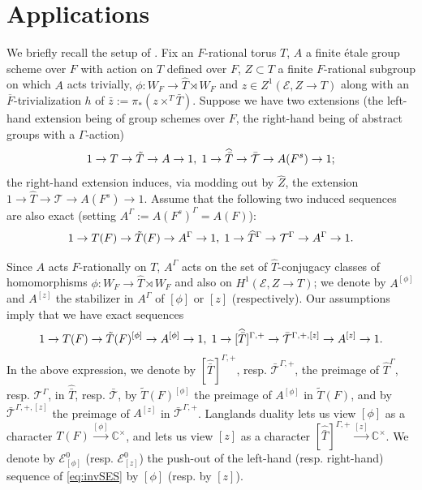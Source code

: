 \documentclass{amsart}
\theoremstyle{definition}
\theoremstyle{remark}
\newcommand{\ov}{\overline}
\begin{document}
\section{Applications}
We briefly recall the setup of \cite[\S 8.3]{Kal26b}. Fix an $F$-rational torus $T$, $A$ a finite \'{e}tale group scheme over $F$ with action on $T$ defined over $F$, $Z \subset T$ a finite $F$-rational subgroup on which $A$ acts trivially, $\phi \colon W_{F} \to \widehat{T} \rtimes W_{F}$ and $z \in Z^{1}(\mathcal{E}, Z \to T)$ along with an $\ov{F}$-trivialization $h$ of $\bar{z}:=\pi_{*}(z \times^{T} \bar{T})$. Suppose we have two extensions (the left-hand extension being of group schemes over $F$, the right-hand being of abstract groups with a $\Gamma$-action)
\begin{equation*}
    1 \to T \to \tilde{T} \to A \to 1, \hspace{1mm} 1 \to \widehat{\bar{T}} \to \bar{\mathcal{T}} \to A(F^{s}) \to 1;
\end{equation*}
the right-hand extension induces, via modding out by $\widehat{Z}$, the extension $1 \to \widehat{T} \to \mathcal{T} \to A(F^{s}) \to 1$. Assume that the following two induced sequences are also exact (setting $A^{\Gamma}:= A(F^{s})^{\Gamma} = A(F)$):
\begin{equation*}
    1 \to T(F) \to \tilde{T}(F) \to A^{\Gamma} \to 1, \hspace{1mm} 1 \to \widehat{T}^{\Gamma} \to \mathcal{T}^{\Gamma} \to A^{\Gamma} \to 1.
\end{equation*}

Since $A$ acts $F$-rationally on $T$, $A^{\Gamma}$ acts on the set of $\widehat{T}$-conjugacy classes of homomorphisms $\phi \colon W_{F} \to \widehat{T} \rtimes W_{F}$ and also on $H^{1}(\mathcal{E}, Z \to T)$; we denote by $A^{[\phi]}$ and $A^{[z]}$ the stabilizer in $A^{\Gamma}$ of $[\phi]$ or $[z]$ (respectively). Our assumptions imply that we have exact sequences 
\begin{equation}\label{eq:invSES}
1 \to T(F) \to \tilde{T}(F)^{[\phi]} \to A^{[\phi]} \to 1, \hspace{1mm} 1 \to [\widehat{\bar{T}}]^{\Gamma,+} \to \bar{\mathcal{T}}^{\Gamma,+,[z]} \to A^{[z]} \to 1.
\end{equation}
In the above expression, we denote by $[\widehat{\bar{T}}]^{\Gamma,+}$, resp. $\bar{\mathcal{T}}^{\Gamma,+}$, the preimage of $\widehat{T}^{\Gamma}$, resp. $\mathcal{T}^{\Gamma}$, in $\widehat{\bar{T}}$, resp. $\bar{\mathcal{T}}$, by $\tilde{T}(F)^{[\phi]}$ the preimage of $A^{[\phi]}$ in $\tilde{T}(F)$, and by $\bar{\mathcal{T}}^{\Gamma,+,[z]}$ the preimage of $A^{[z]}$ in $\bar{\mathcal{T}}^{\Gamma,+}$. Langlands duality lets us view $[\phi]$ as a character $T(F) \xrightarrow{[\phi]} \mathbb{C}^{\times}$, and \cite[Corollary 7.11]{Dillery1} lets us view $[z]$ as a character $[\widehat{\bar{T}}]^{\Gamma,+} \xrightarrow{[z]} \mathbb{C}^{\times}$. We denote by $\mathcal{E}_{[\phi]}^{0}$ (resp. $\mathcal{E}_{[z]}^{0}$) the push-out of the left-hand (resp. right-hand) sequence of \eqref{eq:invSES} by $[\phi]$ (resp. by $[z]$).
\end{document}
